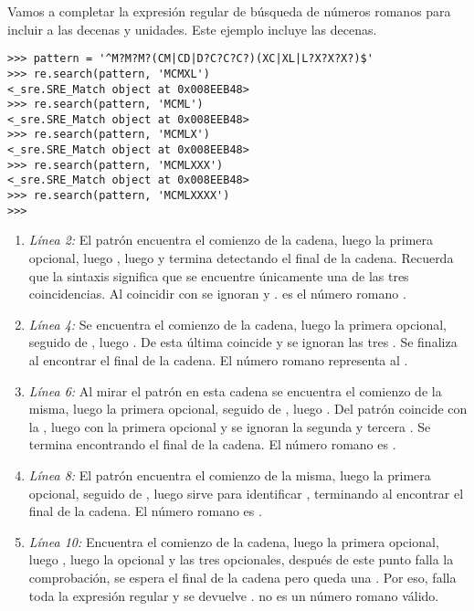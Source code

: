 Vamos a completar la expresión regular de búsqueda de números romanos para incluir a las decenas y unidades. Este ejemplo incluye las decenas.

\noindent\begin{minipage}{\textwidth}
\begin{lstlisting}[mathescape=False]
>>> pattern = '^M?M?M?(CM|CD|D?C?C?C?)(XC|XL|L?X?X?X?)$'
>>> re.search(pattern, 'MCMXL')
<_sre.SRE_Match object at 0x008EEB48>
>>> re.search(pattern, 'MCML')
<_sre.SRE_Match object at 0x008EEB48>
>>> re.search(pattern, 'MCMLX')
<_sre.SRE_Match object at 0x008EEB48>
>>> re.search(pattern, 'MCMLXXX')
<_sre.SRE_Match object at 0x008EEB48>
>>> re.search(pattern, 'MCMLXXXX')
>>> 
\end{lstlisting}
\end{minipage}

\begin{enumerate}

\item \emph{Línea 2:} El patrón encuentra el comienzo de la cadena, luego la primera  opcional, luego , luego  y termina detectando el final de la cadena. Recuerda que la sintaxis  significa que se encuentre únicamente una de las tres coincidencias. Al coincidir con  se ignoran  y .  es el número romano .

\item \emph{Línea 4:} Se encuentra el comienzo de la cadena, luego la primera  opcional, seguido de , luego . De esta última coincide  y se ignoran las tres . Se finaliza al encontrar el final de la cadena. El número romano  representa al .

\item \emph{Línea 6:} Al mirar el patrón en esta cadena se encuentra el comienzo de la misma, luego la primera  opcional, seguido de , luego . Del patrón  coincide con la , luego con la primera  opcional y se ignoran la segunda y tercera . Se termina encontrando el final de la cadena. El número romano  es .

\item \emph{Línea 8:} El patrón encuentra el comienzo de la misma, luego la primera  opcional, seguido de , luego  sirve para identificar , terminando al encontrar el final de la cadena. El número romano  es .

\item \emph{Línea 10:} Encuentra el comienzo de la cadena, luego la primera  opcional, luego , luego la  opcional y las tres  opcionales, después de este punto falla la comprobación, se espera el final de la cadena pero queda una . Por eso, falla toda la expresión regular y se devuelve .  no es un número romano válido.

\end{enumerate}

